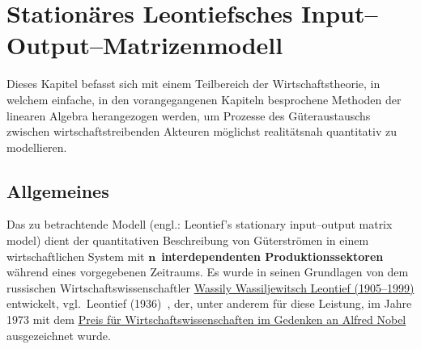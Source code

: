 \chapter[Leontiefsches 
Input--Output--Matrizenmodell]{Station\"{a}res Leontiefsches
Input--Output--Matrizenmodell}
\hfill\hbox{}

\vspace{10mm}
\noindent
Dieses Kapitel befasst sich mit einem Teilbereich der
Wirtschaftstheorie, in welchem einfache, in den vorangegangenen
Kapiteln besprochene Methoden der linearen
Algebra herangezogen werden, um Prozesse des G\"uteraustauschs
zwischen wirtschaftstreibenden Akteuren m\"oglichst realit\"atsnah
quantitativ zu modellieren.

\section[Allgemeines]%
{Allgemeines}
Das zu betrachtende Modell (engl.: Leontief's stationary 
input--output matrix model) dient der quantitativen Beschreibung 
von G\"uterstr\"omen in
einem wirtschaftlichen System mit
$\boldsymbol{n}$~{\bf interdependenten Produktionssektoren} 
w\"ahrend eines vorgegebenen Zeitraums. Es
wurde in seinen Grundlagen von dem russischen
Wirtschaftswissenschaftler
\href{http://en.wikipedia.org/wiki/Leontief}{Wassily Wassiljewitsch
Leontief (1905--1999)} entwickelt, vgl.~Leontief 
(1936)~, der, unter anderem f\"ur diese Leistung, im 
Jahre 1973 mit dem
\href{http://www.nobelprize.org/nobel_prizes/economics/laureates/1973/}{Preis f\"ur Wirtschaftswissenschaften im Gedenken an Alfred 
Nobel} ausgezeichnet wurde.

